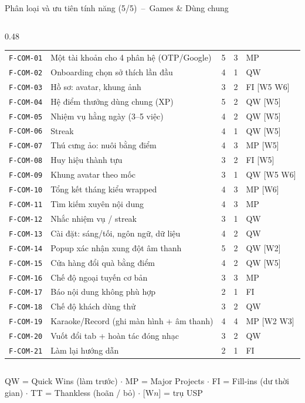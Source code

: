 \documentclass[aspectratio=169]{beamer}
\begin{document}
\begin{frame}{Phân loại và ưu tiên tính năng (5/5)~--~Games \& Dùng chung}
\begin{columns}
\begin{column}{0.48\textwidth}
\begin{center}
\begin{tabular}{@{}p{1.35cm}p{3.2cm}p{0.22cm}p{0.22cm}p{1.15cm}@{}}
\midrule
\texttt{F-COM-01} & Một tài khoản cho 4 phân hệ (OTP/Google) & 5 & 3 & MP \\
\texttt{F-COM-02} & Onboarding chọn sở thích lần đầu & 4 & 1 & QW \\
\texttt{F-COM-03} & Hồ sơ: avatar, khung ảnh & 3 & 2 & FI [W5 W6] \\
\texttt{F-COM-04} & Hệ điểm thưởng dùng chung (XP) & 5 & 2 & QW [W5] \\
\texttt{F-COM-05} & Nhiệm vụ hằng ngày (3--5 việc) & 4 & 2 & QW [W5] \\
\texttt{F-COM-06} & Streak & 4 & 1 & QW [W5] \\
\texttt{F-COM-07} & Thú cưng ảo: nuôi bằng điểm & 4 & 3 & MP [W5] \\
\texttt{F-COM-08} & Huy hiệu thành tựu & 3 & 2 & FI [W5] \\
\texttt{F-COM-09} & Khung avatar theo mốc & 3 & 1 & QW [W5 W6] \\
\texttt{F-COM-10} & Tổng kết tháng kiểu wrapped & 4 & 3 & MP [W6] \\
\texttt{F-COM-11} & Tìm kiếm xuyên nội dung & 4 & 3 & MP \\
\texttt{F-COM-12} & Nhắc nhiệm vụ / streak & 3 & 1 & QW \\
\texttt{F-COM-13} & Cài đặt: sáng/tối, ngôn ngữ, dữ liệu & 4 & 2 & QW \\
\texttt{F-COM-14} & Popup xác nhận xung đột âm thanh & 5 & 2 & QW [W2] \\
\texttt{F-COM-15} & Cửa hàng đổi quà bằng điểm & 4 & 2 & QW [W5] \\
\texttt{F-COM-16} & Chế độ ngoại tuyến cơ bản & 3 & 3 & MP \\
\texttt{F-COM-17} & Báo nội dung không phù hợp & 2 & 1 & FI \\
\texttt{F-COM-18} & Chế độ khách dùng thử & 3 & 2 & QW \\
\texttt{F-COM-19} & Karaoke/Record (ghi màn hình + âm thanh) & 4 & 4 & MP [W2 W3] \\
\texttt{F-COM-20} & Vuốt đổi tab + hoàn tác đóng nhạc & 3 & 2 & QW \\
\texttt{F-COM-21} & Làm lại hướng dẫn & 2 & 1 & FI \\
\bottomrule
\end{tabular}
    \end{center}\end{column}
  \end{columns}
  \vfill
  {\tiny\color{brandgray} QW = Quick Wins (làm trước) $\cdot$ MP = Major Projects $\cdot$ FI = Fill-ins (dư thời gian) $\cdot$ TT = Thankless (hoãn / bỏ) $\cdot$ [W$n$] = trụ USP}
\end{frame}
\end{document}
